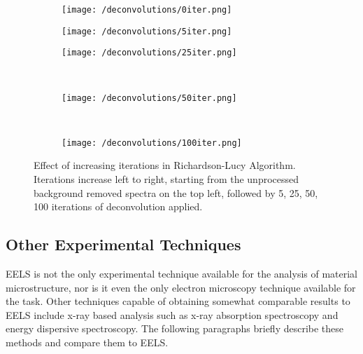 \begin{figure}

	\begin{subfigure}{0.3 \textwidth}
		\texttt{[image: /deconvolutions/0iter.png]}
	\end{subfigure}
	\hfill
	\begin{subfigure}{0.3 \textwidth}
		\texttt{[image: /deconvolutions/5iter.png]}
	\end{subfigure}
	\hfill
	\begin{subfigure}{0.3 \textwidth}
		\texttt{[image: /deconvolutions/25iter.png]}
	\end{subfigure}
	\\
	\begin{subfigure}{0.33 \textwidth}
		
		\texttt{[image: /deconvolutions/50iter.png]}
	\end{subfigure}
	~
	\begin{subfigure}{0.33 \textwidth}
		
		\texttt{[image: /deconvolutions/100iter.png]}
	\end{subfigure}

	\begin{subfigure}{0.33 \textwidth}
	\end{subfigure}

	\caption{Effect of increasing iterations in Richardson-Lucy Algorithm.  Iterations increase left to right, starting from the unprocessed background removed spectra on the top left, followed by 5, 25, 50, 100 iterations of deconvolution applied.  }
	\label{RL_iter}
\end{figure}


\subsection{Other Experimental Techniques}
EELS is not the only experimental technique available for the analysis of material microstructure, nor is it even the only electron microscopy technique available for the task. Other techniques capable of obtaining somewhat comparable results to EELS include x-ray based analysis such as x-ray absorption spectroscopy and energy dispersive spectroscopy.  The following paragraphs briefly describe these methods and compare them to EELS.

